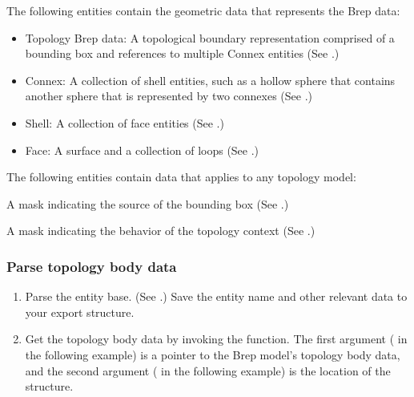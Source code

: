 \documentclass[letterpaper,12pt,english,openany,oneside]{sphinxmanual}
\begin{document}
The following entities contain the geometric data that represents the Brep data:
\begin{itemize}
\item {} 
Topology Brep data: A topological boundary representation comprised of a bounding box and references to multiple Connex entities (See .)

\item {} 
Connex: A collection of shell entities, such as a hollow sphere that contains another sphere that is represented by two connexes (See .)

\item {} 
Shell: A collection of face entities (See .)

\item {} 
Face: A surface and a collection of loops (See .)

\end{itemize}


The following entities contain data that applies to any topology model:

 A mask indicating the source of the bounding box (See .)

 A mask indicating the behavior of the topology context (See .)


\subsubsection{Parse topology body data}
\label{\detokenize{Plugins_A3D_API:parse-topology-body-data}}\begin{enumerate}
%
\item {} 
Parse the entity base. (See .) Save the entity name and other relevant data to your export structure.

\item {} 
Get the topology body data by invoking the  function. The first argument ( in the following example) is a pointer to the Brep model’s topology body data, and the second argument ( in the following example) is the location of the  structure.

\end{enumerate}
\end{document}
